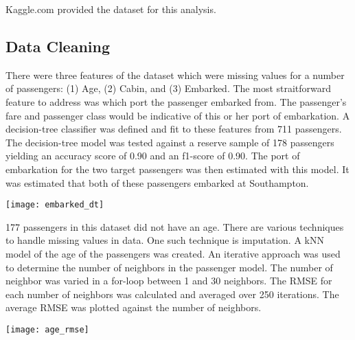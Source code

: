 \documentclass[10pt]{article}
\begin{document}
\begin{multicols}{2}
	Kaggle.com provided the dataset for this analysis.

\subsection{Data Cleaning}
	

	There were three features of the dataset which were missing values for a number of passengers: (1) Age, (2) Cabin, and (3) Embarked.
	The most straitforward feature to address was which port the passenger embarked from.
	The passenger's fare and passenger class would be indicative of this or her port of embarkation.
	A decision-tree classifier was defined and fit to these features from 711 passengers.
	The decision-tree model was tested against a reserve sample of 178 passengers yielding an accuracy score of 0.90 and an f1-score of 0.90.
	The port of embarkation for the two target passengers was then estimated with this model.
	It was estimated that both of these passengers embarked at Southampton.\\
	\begin{center}
	\texttt{[image: embarked\_dt]}\\
	\end{center}
	177 passengers in this dataset did not have an age.
	There are various techniques to handle missing values in data.
	One such technique is imputation.
	A kNN model of the age of the passengers was created.
	An iterative approach was used to determine the number of neighbors in the passenger model.
	The number of neighbor was varied in a for-loop between 1 and 30 neighbors.
	The RMSE for each number of neighbors was calculated and averaged over 250 iterations.
	The average RMSE was plotted against the number of neighbors.
	\begin{center}	
	\texttt{[image: age\_rmse]}\\
	\end{center}
	

\end{multicols}
\end{document}
